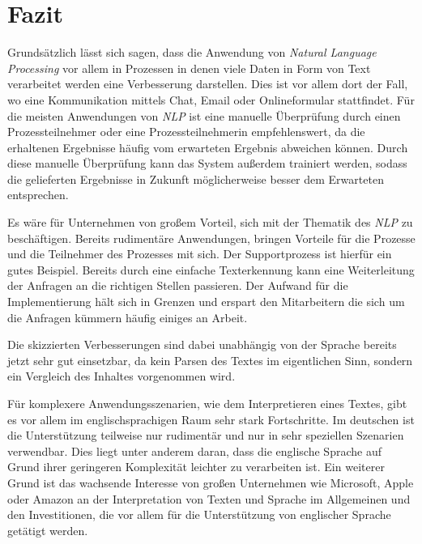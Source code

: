 \chapter{Fazit}
\label{cha:Conclusions}
Grundsätzlich lässt sich sagen, dass die Anwendung von \textit{Natural Language Processing} vor allem in Prozessen in denen viele Daten in Form von Text verarbeitet werden eine Verbesserung darstellen. Dies ist vor allem dort der Fall, wo eine Kommunikation mittels Chat, Email oder Onlineformular stattfindet. Für die meisten Anwendungen von \textit{NLP} ist eine manuelle Überprüfung durch einen Prozessteilnehmer oder eine Prozessteilnehmerin empfehlenswert, da die erhaltenen Ergebnisse häufig vom erwarteten Ergebnis abweichen können. Durch diese manuelle Überprüfung kann das System außerdem trainiert werden, sodass die gelieferten Ergebnisse in Zukunft möglicherweise besser dem Erwarteten entsprechen. 

Es wäre für Unternehmen von großem Vorteil, sich mit der Thematik des \textit{NLP} zu beschäftigen. Bereits rudimentäre Anwendungen, bringen Vorteile für die Prozesse und die Teilnehmer des Prozesses mit sich. Der Supportprozess ist hierfür ein gutes Beispiel. Bereits durch eine einfache Texterkennung kann eine Weiterleitung der Anfragen an die richtigen Stellen passieren. Der Aufwand für die Implementierung hält sich in Grenzen und erspart den Mitarbeitern die sich um die Anfragen kümmern häufig einiges an Arbeit.

Die skizzierten Verbesserungen sind dabei unabhängig von der Sprache bereits jetzt sehr gut einsetzbar, da kein Parsen des Textes im eigentlichen Sinn, sondern ein Vergleich des Inhaltes vorgenommen wird.

Für komplexere Anwendungsszenarien, wie dem Interpretieren eines Textes, gibt es vor allem im englischsprachigen Raum sehr stark Fortschritte. Im deutschen ist die Unterstützung teilweise nur rudimentär und nur in sehr speziellen Szenarien verwendbar. Dies liegt unter anderem daran, dass die englische Sprache auf Grund ihrer geringeren Komplexität leichter zu verarbeiten ist. Ein weiterer Grund ist das wachsende Interesse von großen Unternehmen wie Microsoft, Apple oder Amazon an der Interpretation von Texten und Sprache im Allgemeinen und den Investitionen, die vor allem für die Unterstützung von englischer Sprache getätigt werden.
